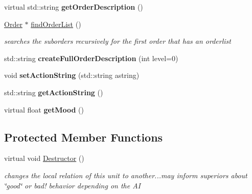 \begin{DoxyCompactItemize}
\item 
virtual std\+::string {\bfseries get\+Order\+Description} ()\hypertarget{classOrder_a8c9c2918c9f47461f55ec1e455599125}{}\label{classOrder_a8c9c2918c9f47461f55ec1e455599125}

\item 
\hyperlink{classOrder}{Order} $\ast$ \hyperlink{classOrder_a7f655c6ca6ea6795c20ae342824fb75e}{find\+Order\+List} ()\hypertarget{classOrder_a7f655c6ca6ea6795c20ae342824fb75e}{}\label{classOrder_a7f655c6ca6ea6795c20ae342824fb75e}

\begin{DoxyCompactList}\small\item\em searches the suborders recursively for the first order that has an orderlist \end{DoxyCompactList}\item 
std\+::string {\bfseries create\+Full\+Order\+Description} (int level=0)\hypertarget{classOrder_a8663aff64fb7b19585b5f332791b01c5}{}\label{classOrder_a8663aff64fb7b19585b5f332791b01c5}

\item 
void {\bfseries set\+Action\+String} (std\+::string astring)\hypertarget{classOrder_a87306db3bab82f437e1c6345fa2a8550}{}\label{classOrder_a87306db3bab82f437e1c6345fa2a8550}

\item 
std\+::string {\bfseries get\+Action\+String} ()\hypertarget{classOrder_a823c32fd0bd44fd713d90f140bbc6b95}{}\label{classOrder_a823c32fd0bd44fd713d90f140bbc6b95}

\item 
virtual float {\bfseries get\+Mood} ()\hypertarget{classOrder_a14efc20460cbef5c6ff75f27785df9fe}{}\label{classOrder_a14efc20460cbef5c6ff75f27785df9fe}

\end{DoxyCompactItemize}
\subsection*{Protected Member Functions}
\begin{DoxyCompactItemize}
\item 
virtual void \hyperlink{classOrder_ad30c31d3ceddd4f4019009203b927fc1}{Destructor} ()\hypertarget{classOrder_ad30c31d3ceddd4f4019009203b927fc1}{}\label{classOrder_ad30c31d3ceddd4f4019009203b927fc1}

\begin{DoxyCompactList}\small\item\em changes the local relation of this unit to another...may inform superiors about \char`\"{}good\char`\"{} or bad! behavior depending on the AI \end{DoxyCompactList}\end{DoxyCompactItemize}
